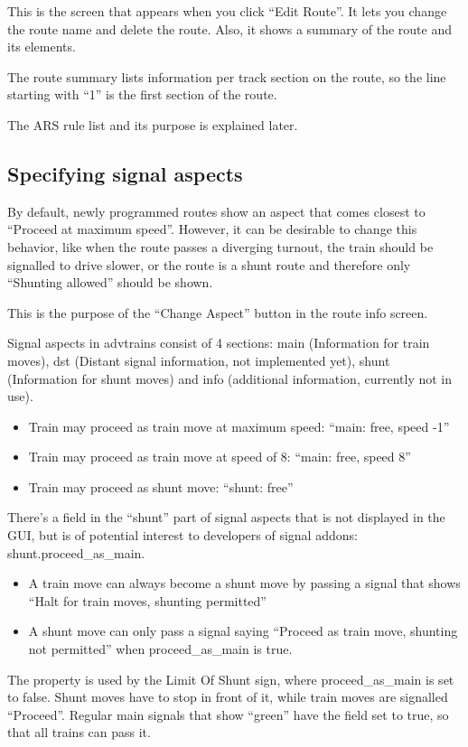 \documentclass[english]{paper}
\begin{document}
This is the screen that appears when you click ``Edit Route''. It
lets you change the route name and delete the route. Also, it shows
a summary of the route and its elements.

The route summary lists information per track section on the route,
so the line starting with ``1'' is the first section of the route.

The ARS rule list and its purpose is explained later.

\subsection{Specifying signal aspects}

By default, newly programmed routes show an aspect that comes closest
to ``Proceed at maximum speed''. However, it can be desirable to
change this behavior, like when the route passes a diverging turnout,
the train should be signalled to drive slower, or the route is a shunt
route and therefore only ``Shunting allowed'' should be shown.

This is the purpose of the ``Change Aspect'' button in the route
info screen.

Signal aspects in advtrains consist of 4 sections: main (Information
for train moves), dst (Distant signal information, not implemented
yet), shunt (Information for shunt moves) and info (additional information,
currently not in use).
\begin{itemize}
\item Train may proceed as train move at maximum speed: ``main: free, speed
-1''
\item Train may proceed as train move at speed of 8: ``main: free, speed
8''
\item Train may proceed as shunt move: ``shunt: free''
\end{itemize}
There's a field in the ``shunt'' part of signal aspects that is
not displayed in the GUI, but is of potential interest to developers
of signal addons: shunt.proceed\_as\_main.
\begin{itemize}
\item A train move can always become a shunt move by passing a signal that
shows ``Halt for train moves, shunting permitted''
\item A shunt move can only pass a signal saying ``Proceed as train move,
shunting not permitted'' when proceed\_as\_main is true.
\end{itemize}
The property is used by the Limit Of Shunt sign, where proceed\_as\_main
is set to false. Shunt moves have to stop in front of it, while train
moves are signalled ``Proceed''. Regular main signals that show
``green'' have the field set to true, so that all trains can pass
it.
\end{document}
